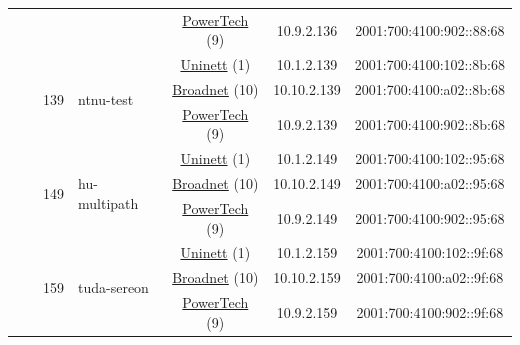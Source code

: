 \begin{small}
\begin{center}
\begin{longtable}{|c|c|c|c|c|c|c|c|}
  &  &  &  & \multicolumn{2}{|c|}{\tiny{\href{http://www.powertech.no}{PowerTech} (9)}} & \tiny{10.9.2.136} & \tiny{2001:700:4100:902::88:68} \\* \cline{3-3}\cline{4-4}\cline{5-5}\cline{6-6}\cline{7-7}\cline{8-8}
  &  & \multirow{3}{*}{\tiny{139}} & \multicolumn{1}{|l|}{\multirow{3}{*}{\tiny{ntnu-test}}} & \multicolumn{2}{|c|}{\tiny{\href{https://www.uninett.no}{Uninett} (1)}} & \tiny{10.1.2.139} & \tiny{2001:700:4100:102::8b:68} \\* \cline{5-5}\cline{6-6}\cline{7-7}\cline{8-8}
  &  &  &  & \multicolumn{2}{|c|}{\tiny{\href{https://www.broadnet.no}{Broadnet} (10)}} & \tiny{10.10.2.139} & \tiny{2001:700:4100:a02::8b:68} \\* \cline{5-5}\cline{6-6}\cline{7-7}\cline{8-8}
  &  &  &  & \multicolumn{2}{|c|}{\tiny{\href{http://www.powertech.no}{PowerTech} (9)}} & \tiny{10.9.2.139} & \tiny{2001:700:4100:902::8b:68} \\* \cline{3-3}\cline{4-4}\cline{5-5}\cline{6-6}\cline{7-7}\cline{8-8}
  &  & \multirow{3}{*}{\tiny{149}} & \multicolumn{1}{|l|}{\multirow{3}{*}{\tiny{hu-multipath}}} & \multicolumn{2}{|c|}{\tiny{\href{https://www.uninett.no}{Uninett} (1)}} & \tiny{10.1.2.149} & \tiny{2001:700:4100:102::95:68} \\* \cline{5-5}\cline{6-6}\cline{7-7}\cline{8-8}
  &  &  &  & \multicolumn{2}{|c|}{\tiny{\href{https://www.broadnet.no}{Broadnet} (10)}} & \tiny{10.10.2.149} & \tiny{2001:700:4100:a02::95:68} \\* \cline{5-5}\cline{6-6}\cline{7-7}\cline{8-8}
  &  &  &  & \multicolumn{2}{|c|}{\tiny{\href{http://www.powertech.no}{PowerTech} (9)}} & \tiny{10.9.2.149} & \tiny{2001:700:4100:902::95:68} \\* \cline{3-3}\cline{4-4}\cline{5-5}\cline{6-6}\cline{7-7}\cline{8-8}
  &  & \multirow{3}{*}{\tiny{159}} & \multicolumn{1}{|l|}{\multirow{3}{*}{\tiny{tuda-sereon}}} & \multicolumn{2}{|c|}{\tiny{\href{https://www.uninett.no}{Uninett} (1)}} & \tiny{10.1.2.159} & \tiny{2001:700:4100:102::9f:68} \\* \cline{5-5}\cline{6-6}\cline{7-7}\cline{8-8}
  &  &  &  & \multicolumn{2}{|c|}{\tiny{\href{https://www.broadnet.no}{Broadnet} (10)}} & \tiny{10.10.2.159} & \tiny{2001:700:4100:a02::9f:68} \\* \cline{5-5}\cline{6-6}\cline{7-7}\cline{8-8}
  &  &  &  & \multicolumn{2}{|c|}{\tiny{\href{http://www.powertech.no}{PowerTech} (9)}} & \tiny{10.9.2.159} & \tiny{2001:700:4100:902::9f:68} \\* \cline{3-3}\cline{4-4}\cline{5-5}\cline{6-6}\cline{7-7}\cline{8-8}

\end{longtable}
\end{center}
\end{small}
